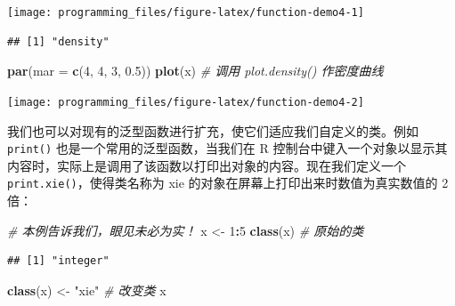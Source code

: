 \documentclass[
  b5paper,
  UTF8,twoside]{book}
\newenvironment{Shaded}{\begin{snugshade}}{\end{snugshade}}
\newcommand{\AttributeTok}[1]{\textcolor[rgb]{0.13,0.29,0.53}{#1}}
\newcommand{\CommentTok}[1]{\textcolor[rgb]{0.56,0.35,0.01}{\textit{#1}}}
\newcommand{\DecValTok}[1]{\textcolor[rgb]{0.00,0.00,0.81}{#1}}
\newcommand{\FloatTok}[1]{\textcolor[rgb]{0.00,0.00,0.81}{#1}}
\newcommand{\FunctionTok}[1]{\textcolor[rgb]{0.13,0.29,0.53}{\textbf{#1}}}
\newcommand{\NormalTok}[1]{#1}
\newcommand{\OtherTok}[1]{\textcolor[rgb]{0.56,0.35,0.01}{#1}}
\newcommand{\SpecialCharTok}[1]{\textcolor[rgb]{0.81,0.36,0.00}{\textbf{#1}}}
\newcommand{\StringTok}[1]{\textcolor[rgb]{0.31,0.60,0.02}{#1}}
\begin{document}
\begin{center}\texttt{[image: programming\_files/figure-latex/function-demo4-1]} \end{center}

\begin{Shaded}
\end{Shaded}

\begin{verbatim}
## [1] "density"
\end{verbatim}

\begin{Shaded}
\begin{Highlighting}[]
\FunctionTok{par}\NormalTok{(}\AttributeTok{mar =} \FunctionTok{c}\NormalTok{(}\DecValTok{4}\NormalTok{, }\DecValTok{4}\NormalTok{, }\DecValTok{3}\NormalTok{, }\FloatTok{0.5}\NormalTok{))}
\FunctionTok{plot}\NormalTok{(x) }\CommentTok{\# 调用 plot.density() 作密度曲线}
\end{Highlighting}
\end{Shaded}

\begin{center}\texttt{[image: programming\_files/figure-latex/function-demo4-2]} \end{center}

我们也可以对现有的泛型函数进行扩充，使它们适应我们自定义的类。例如 \texttt{print()} 也是一个常用的泛型函数，当我们在 R 控制台中键入一个对象以显示其内容时，实际上是调用了该函数以打印出对象的内容。现在我们定义一个 \texttt{print.xie()}，使得类名称为 xie 的对象在屏幕上打印出来时数值为真实数值的 2 倍：

\begin{Shaded}
\begin{Highlighting}[]
\CommentTok{\# 本例告诉我们，眼见未必为实！}
\NormalTok{x }\OtherTok{\textless{}{-}} \DecValTok{1}\SpecialCharTok{:}\DecValTok{5}
\FunctionTok{class}\NormalTok{(x) }\CommentTok{\# 原始的类}
\end{Highlighting}
\end{Shaded}

\begin{verbatim}
## [1] "integer"
\end{verbatim}

\begin{Shaded}
\begin{Highlighting}[]
\FunctionTok{class}\NormalTok{(x) }\OtherTok{\textless{}{-}} \StringTok{"xie"} \CommentTok{\# 改变类}
\NormalTok{x}
\end{Highlighting}
\end{Shaded}
\end{document}
